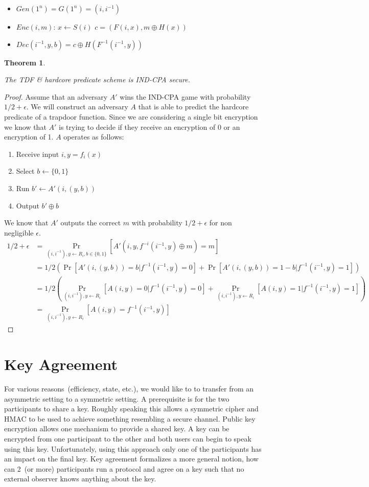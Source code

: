 \documentclass{article}
\newtheorem{thm}{Theorem}[section]
\newenvironment{theorem}{\begin{thm}\begin{rm}}%
{\end{rm}\end{thm}}
\begin{document}
\begin{itemize}
\item $Gen(1^n) = G(1^n) = (i, i^{-1})$
\item $Enc(i, m)$:
\subitem $x\leftarrow S(i)$
\subitem $c = (F(i, x), m\oplus H(x))$
\item $Dec(i^{-1}, y, b) = c \oplus H(F^{-1}(i^{-1}, y))$
\end{itemize}
\begin{theorem}
The TDF \& hardcore predicate scheme is IND-CPA secure.
\end{theorem}
\begin{proof}
Assume that an adversary $A'$ wins the IND-CPA game with probability $1/2 + \epsilon$.  We will construct an adversary $A$ that is able to predict the hardcore predicate of a trapdoor function.  Since we are considering a single bit encryption we know that $A'$ is trying to decide if they receive an encryption of 0 or an encryption of 1. $A$ operates as follows:
\begin{enumerate}
\item Receive input $i, y = f_i(x)$
\item Select $b\leftarrow \{0, 1\}$
\item Run $b' \leftarrow A'(i, (y, b))$
\item Output $b'\oplus b$
\end{enumerate}
We know that $A'$ outputs the correct $m$ with probability $1/2+\epsilon$ for non negligible $\epsilon$.
\begin{align*}
1/2+\epsilon &= \Pr_{(i, i^{-1}), y\leftarrow R_i, b\in\{0,1\}}[A'(i,y, f^{-i}(i^{-1}, y)\oplus m) = m]\\
&=1/2\left(\Pr[A'(i, (y, b))=b| f^{-1}(i^{-1}, y) = 0]+\Pr[A'(i, (y, b))=1-b| f^{-1}(i^{-1}, y) = 1] \right)\\
&=1/2\left(\Pr_{(i, i^{-1}), y\leftarrow R_i}[A(i, y) =0 |  f^{-1}(i^{-1}, y)  = 0] + \Pr_{(i, i^{-1}), y\leftarrow R_i}[A(i, y) =1 | f^{-1}(i^{-1}, y) =1]\right)\\
&= \Pr_{(i, i^{-1}), y\leftarrow R_i}[A(i, y) = f^{-1}(i^{-1}, y) ] 
\end{align*}
\end{proof}
\section{Key Agreement}
For various reasons~(efficiency, state, etc.), we would like to to transfer from an asymmetric setting to a symmetric setting.  A prerequisite is for the two participants to share a key.  Roughly speaking this allows a symmetric cipher and HMAC to be used to achieve something resembling a secure channel.  Public key encryption allows one mechanism to provide a shared key.  A key can be encrypted from one participant to the other and both users can begin to speak using this key.  Unfortunately, using this approach only one of the participants has an impact on the final key.  Key agreement formalizes a more general notion, how can 2~(or more) participants run a protocol and agree on a key such that no external observer knows anything about the key.
\end{document}
